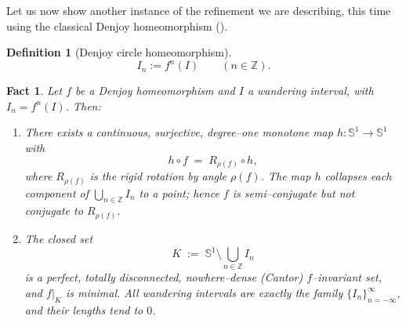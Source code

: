 \documentclass[10pt,a4paper]{article}
\theoremstyle{definition}
\newtheorem{defi}{Definition}[section]
\theoremstyle{remark}
\theoremstyle{plain}
\newtheorem*{fact}{Fact}
\begin{document}
 Let us now show another instance of the refinement we are describing, this time using the classical Denjoy homeomorphism (\cite{denjoy}).

 \begin{defi}[Denjoy circle homeomorphism]
 $$
 I_n:=f^n(I)\qquad(n\in\mathbb Z).
 $$
 \end{defi}

 \begin{fact}
 Let $f$ be a Denjoy homeomorphism and $I$ a wandering interval, with $I_n=f^n(I)$. Then:
 \begin{enumerate}
 \item There exists a continuous, surjective, degree–one monotone map $h:\mathbb S^1\to\mathbb S^1$ with
 $$ h\circ f \;=\; R_{\rho(f)}\circ h, $$
 where $R_{\rho(f)}$ is the rigid rotation by angle $\rho(f)$. The map $h$ collapses each component of
 $\bigcup_{n\in\mathbb Z} I_n$ to a point; hence $f$ is semi–conjugate but not conjugate to $R_{\rho(f)}$.
 \item The closed set
 $$ K \;:=\; \mathbb S^1 \setminus \bigcup_{n\in\mathbb Z} I_n $$
 is a perfect, totally disconnected, nowhere–dense (Cantor) $f$–invariant set, and $f|_K$ is minimal. All wandering intervals are exactly the family $\{I_n\}_{n=-\infty}^{\infty}$, and their lengths tend to $0$.
 \end{enumerate}
 \end{fact}
\end{document}
